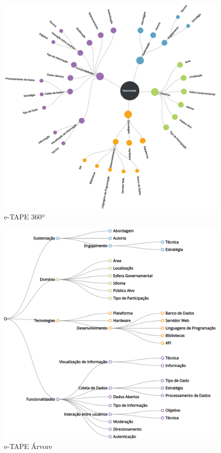 \begin{figure}[!ht]
    \centering
    \includegraphics[scale=0.20]{./figuras/taxonomia-cropped.png}
    \caption{e-TAPE 360º}
    \label{fig:e-tape360}
\end{figure}

\vspace{1cm}

\begin{figure}[!ht]
    \centering
    \includegraphics[scale=0.20]{./figuras/taxonopart-horizontal.png}
    \caption{e-TAPE Árvore}
    \label{fig:e-tapeArvore}
\end{figure}
\newpage

